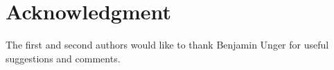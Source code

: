 \documentclass[final,reqno]{siamltex}
\begin{document}
\section*{Acknowledgment} The first and second authors would like to thank Benjamin Unger for useful 
suggestions and comments.


%

\end{document}
